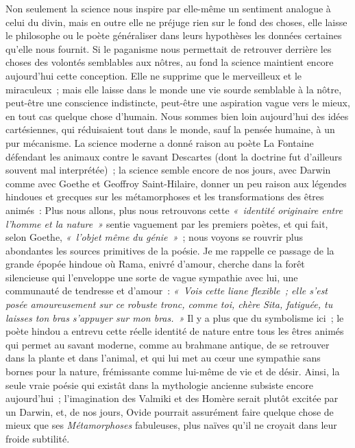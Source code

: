 \documentclass[french,twoside]{book} %
\begin{document}
Non seulement la science nous inspire par elle-même un sentiment analogue à celui du divin, mais en outre elle ne préjuge rien sur le fond des choses, elle laisse le philosophe ou le poète généraliser dans leurs hypothèses les données certaines qu’elle nous fournit. Si le paganisme nous permettait de retrouver derrière les choses des volontés semblables aux nôtres, au fond la science maintient encore aujourd’hui cette conception. Elle ne supprime que le merveilleux et le miraculeux ; mais elle laisse dans le monde une vie sourde semblable à la nôtre, peut-être une conscience indistincte, peut-être une aspiration vague vers le  mieux, en tout cas quelque chose d’humain. Nous sommes bien loin aujourd’hui des idées cartésiennes, qui réduisaient tout dans le monde, sauf la pensée humaine, à un pur mécanisme. La science moderne a donné raison au poète La Fontaine défendant les animaux contre le savant Descartes (dont la doctrine fut d’ailleurs souvent mal interprétée) ; la science semble encore de nos jours, avec Darwin comme avec Goethe et Geoffroy Saint-Hilaire, donner un peu raison aux légendes hindoues et grecques sur les métamorphoses et les transformations des êtres animés : Plus nous allons, plus nous retrouvons cette \emph{« identité originaire entre l’homme et la nature »} sentie vaguement par les premiers poètes, et qui fait, selon Goethe, \emph{« l’objet même du génie »} ; nous voyons se rouvrir plus abondantes les sources primitives de la poésie. Je me rappelle ce passage de la grande épopée hindoue où Rama, enivré d’amour, cherche dans la forêt silencieuse qui l’enveloppe une sorte de vague sympathie avec lui, une communauté de tendresse et d’amour : \emph{« Vois cette liane flexible ; elle s’est posée amoureusement sur ce robuste tronc, comme toi, chère Sita, fatiguée, tu laisses ton bras s’appuyer sur mon bras. »} Il y a plus que du symbolisme ici ; le poète hindou a entrevu cette réelle identité de nature entre tous les êtres animés qui permet au savant moderne, comme au brahmane antique, de se retrouver dans la plante et dans l’animal, et qui lui met au cœur une sympathie sans bornes pour la nature, frémissante comme lui-même de vie et de désir. Ainsi, la seule vraie poésie qui existât dans la mythologie ancienne subsiste encore  aujourd’hui ; l’imagination des Valmiki et des Homère serait plutôt excitée par un Darwin, et, de nos jours, Ovide pourrait assurément faire quelque chose de mieux que ses \emph{Métamorphoses} fabuleuses, plus naïves qu’il ne croyait dans leur froide subtilité.
\end{document}
